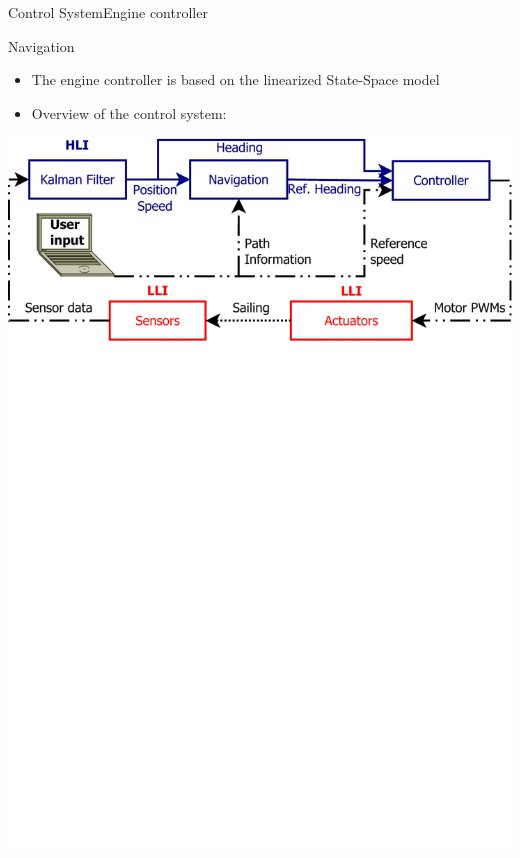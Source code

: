 \begin{frame}{Control System}{Engine controller}
    \begin{block}{Navigation}
		\begin{itemize}
			\item The engine controller is based on the linearized State-Space model
			\item Overview of the control system:
		\end{itemize}
		\includegraphics[trim = 0mm 21cm 0mm 0mm, clip, width=\textwidth]{control/img/controlloop}
    \end{block}
\end{frame}
